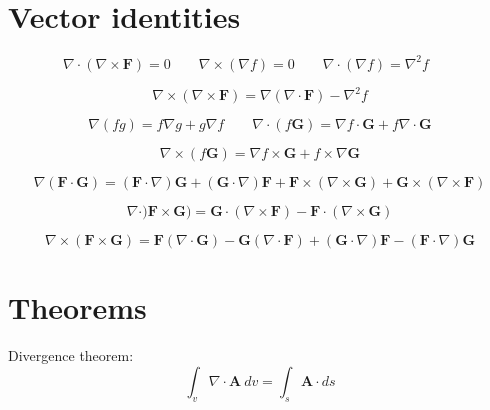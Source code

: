 \documentclass[a4paper]{article}
\begin{document}
\section{Vector identities}

\begin{displaymath}
\nabla\cdot(\nabla\times\mathbf F ) = 0
\qquad
\nabla \times(\nabla f)=0
\qquad
\nabla \cdot (\nabla f)=\nabla^2f
\qquad
\end{displaymath}

\begin{displaymath}
\nabla \times(\nabla \times \mathbf F) =
\nabla (\nabla \cdot \mathbf F) - 
\nabla^2 f
\end{displaymath}

\begin{displaymath}
\nabla(fg)=f\nabla g + g\nabla f
\qquad 
\nabla \cdot(f \mathbf G) =
\nabla f \cdot \mathbf G + f \nabla \cdot \mathbf G
\end{displaymath}

\begin{displaymath}
\nabla \times (f\mathbf G) =
\nabla f \times \mathbf G + f \times \nabla \mathbf G
\end{displaymath}

\begin{displaymath}
\nabla(\mathbf F \cdot \mathbf G) =
(\mathbf F \cdot \nabla) \mathbf G +
(\mathbf G \cdot \nabla) \mathbf F +
\mathbf F \times (\nabla \times \mathbf G) +
\mathbf G \times (\nabla \times \mathbf F)
\end{displaymath}

\begin{displaymath}
\nabla \cdot )\mathbf F \times \mathbf G) =
\mathbf G \cdot (\nabla \times \mathbf F) -
\mathbf F \cdot (\nabla \times \mathbf G)
\end{displaymath}

\begin{displaymath}
\nabla \times (\mathbf F \times \mathbf G) =
\mathbf F (\nabla \cdot \mathbf G) -
\mathbf G (\nabla \cdot \mathbf F) +
(\mathbf G \cdot \nabla) \mathbf F -
(\mathbf F \cdot \nabla) \mathbf G
\end{displaymath}


\section{Theorems}

{\large Divergence theorem:}
\begin{displaymath}
\int_v \nabla \cdot \mathbf A \  dv= \int_s \mathbf A \cdot ds
\end{displaymath}
\end{document}
